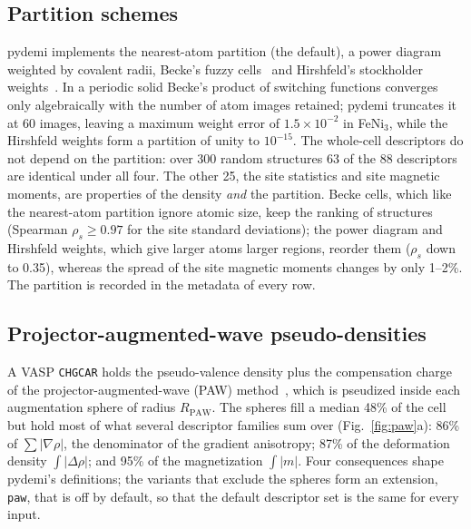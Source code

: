 \documentclass[11pt,a4paper]{article}
\begin{document}
\subsection{Partition schemes}
\label{sec:numerics:partitions}

pydemi implements the nearest-atom partition (the default), a power diagram
weighted by covalent radii, Becke's fuzzy cells~\cite{becke1988} and
Hirshfeld's stockholder weights~\cite{hirshfeld1977}. In a periodic solid
Becke's product of switching functions converges only algebraically with the
number of atom images retained; pydemi truncates it at 60 images, leaving a
maximum weight error of $1.5\times10^{-2}$ in FeNi$_3$, while the Hirshfeld
weights form a partition of unity to $10^{-15}$. The whole-cell descriptors do
not depend on the partition: over 300 random structures 63 of the 88
descriptors are identical under all four. The other 25, the site statistics and
site magnetic moments, are properties of the density \emph{and} the partition.
Becke cells, which like the nearest-atom partition ignore atomic size, keep the
ranking of structures (Spearman $\rho_s\geq0.97$ for the site standard
deviations); the power diagram and Hirshfeld weights, which give larger atoms
larger regions, reorder them ($\rho_s$ down to 0.35), whereas the spread of
the site magnetic moments changes by only 1--2\%. The partition is recorded in
the metadata of every row.

\subsection{Projector-augmented-wave pseudo-densities}
\label{sec:numerics:paw}

A VASP \texttt{CHGCAR} holds the pseudo-valence density plus the compensation
charge of the projector-augmented-wave (PAW) method~\cite{blochl1994,kresse1999},
which is pseudized inside each augmentation sphere of radius $R_{\mathrm{PAW}}$.
The spheres fill a median 48\% of the cell but hold most of what several
descriptor families sum over (Fig.~\ref{fig:paw}a): 86\% of $\sum|\nabla\rho|$,
the denominator of the gradient anisotropy; 87\% of the deformation density
$\int|\Delta\rho|$; and 95\% of the magnetization $\int|m|$. Four consequences
shape pydemi's definitions; the variants that exclude the spheres form an
extension, \texttt{paw}, that is off by default, so that the default
descriptor set is the same for every input.
\end{document}
